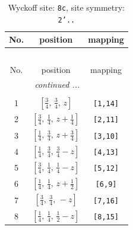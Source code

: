 \documentclass[fleqn,8pt]{jsarticle}
\begin{document}
\renewcommand{\arraystretch}{1.2}
\begin{longtable}{ccc}
\caption{Wyckoff site: {\tt 8c}, site symmetry: {\tt 2'..}}
 \\
 \hline \hline
No. & position & mapping \\ \hline \endfirsthead

\multicolumn{2}{l}{\tablename\ \thetable{}} \\
 \hline \hline
No. & position & mapping \\ \hline \endhead

 \hline \hline
\multicolumn{2}{r}{\footnotesize\it continued ...} \\ \endfoot

 \hline \hline
\multicolumn{2}{r}{} \\ \endlastfoot

1 & $\left[ \frac{3}{4},\, \frac{3}{4},\, z \right]$ & {\tt [1,14]} \\ \hline
2 & $\left[ \frac{3}{4},\, \frac{1}{4},\, z + \frac{1}{4} \right]$ & {\tt [2,11]} \\ \hline
3 & $\left[ \frac{1}{4},\, \frac{3}{4},\, z + \frac{3}{4} \right]$ & {\tt [3,10]} \\ \hline
4 & $\left[ \frac{1}{4},\, \frac{3}{4},\, \frac{3}{4} - z \right]$ & {\tt [4,13]} \\ \hline
5 & $\left[ \frac{3}{4},\, \frac{1}{4},\, \frac{1}{4} - z \right]$ & {\tt [5,12]} \\ \hline
6 & $\left[ \frac{1}{4},\, \frac{1}{4},\, z + \frac{1}{2} \right]$ & {\tt [6,9]} \\ \hline
7 & $\left[ \frac{3}{4},\, \frac{3}{4},\, - z \right]$ & {\tt [7,16]} \\ \hline
8 & $\left[ \frac{1}{4},\, \frac{1}{4},\, \frac{1}{2} - z \right]$ & {\tt [8,15]} \\
\end{longtable}
\renewcommand{\arraystretch}{1.2}
\end{document}
